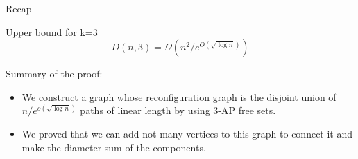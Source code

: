 \begin{frame}{Recap}
    \begin{theorem}{Upper bound for k=3}
        \[D(n,3)=\Omega(n^2/e^{O(\sqrt{\log n})})\]
    \end{theorem}
    \begin{heading}{Summary of the proof:}
    \begin{itemize}
        \item We construct a graph whose reconfiguration graph is the disjoint union of \(n/e^{o(\sqrt{\log n})}\) paths of linear length by using 3-AP free sets.
        \item We proved that we can add not many vertices to this graph to connect it and make the diameter sum of the components.
    \end{itemize}
    \end{heading}
\end{frame}